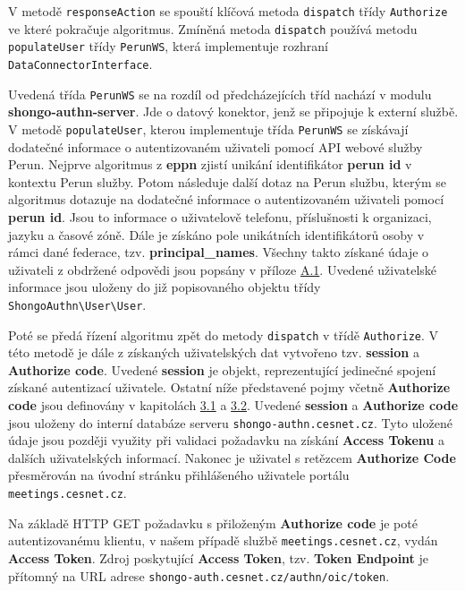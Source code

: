 \documentclass[
  printed, %
  twoside, %
  table,   %
  nolof,     %
  nolot,     %
]{fithesis3}
\begin{document}
\label{sec:responseAction}
V metodě \texttt{responseAction} se spouští klíčová metoda \texttt{dispatch} třídy \texttt{Authorize} ve které pokračuje algoritmus. Zmíněná metoda \texttt{dispatch} používá metodu \texttt{populateUser} třídy \texttt{PerunWS}, která implementuje rozhraní \texttt{DataConnectorInterface}. \par

Uvedená třída \texttt{PerunWS} se na rozdíl od předcházejících tříd nachází v modulu \textbf{shongo-authn-server}. Jde o datový konektor, jenž se připojuje k externí službě. V metodě \texttt{populateUser}, kterou implementuje třída \texttt{PerunWS} se získávají dodatečné informace o autentizovaném uživateli pomocí API webové služby Perun. Nejprve algoritmus z \textbf{eppn} zjistí unikání identifikátor \textbf{perun id} v kontextu Perun služby. Potom následuje další dotaz na Perun službu, kterým se algoritmus dotazuje na dodatečné informace o autentizovaném uživateli pomocí \textbf{perun id}. Jsou to informace o uživatelově telefonu, příslušnosti k organizaci, jazyku a časové zóně. Dále je získáno pole unikátních identifikátorů osoby v rámci dané federace, tzv. \textbf{principal\_names}. Všechny takto získané údaje o uživateli z obdržené odpovědi jsou popsány v příloze \hyperref[table:perunws:user]{A.1}. Uvedené uživatelské informace jsou uloženy do již popisovaného objektu třídy \texttt{ShongoAuthn\textbackslash User\textbackslash User}. \par

Poté se předá řízení algoritmu zpět do metody \texttt{dispatch} v třídě \texttt{Authorize}. V této metodě je dále z získaných uživatelských dat vytvořeno tzv. \textbf{session} a \textbf{Authorize code}. Uvedené \textbf{session} je objekt, reprezentující jedinečné spojení získané autentizací uživatele. Ostatní níže představené pojmy včetně \textbf{Authorize code} jsou definovány v kapitolách \hyperref[sec:oauth]{3.1} a \hyperref[sec:oidc]{3.2}. Uvedené \textbf{session} a \textbf{Authorize code} jsou uloženy do interní databáze serveru \texttt{shongo-authn.cesnet.cz}. Tyto uložené údaje jsou později využity při validaci požadavku na získání \textbf{Access Tokenu} a dalších uživatelských informací. Nakonec je uživatel s retězcem \textbf{Authorize Code} přesměrován na úvodní stránku přihlášeného uživatele portálu \texttt{meetings.cesnet.cz}. \par

Na základě HTTP GET požadavku s přiloženým \textbf{Authorize code} je poté autentizovanému klientu, v našem případě službě \texttt{meetings.cesnet.cz}, vydán  \textbf{Access Token}. Zdroj poskytující \textbf{Access Token}, tzv. \textbf{Token Endpoint} je přítomný na URL adrese \texttt{shongo-auth.cesnet.cz/authn/oic/token}. \par 
\end{document}
